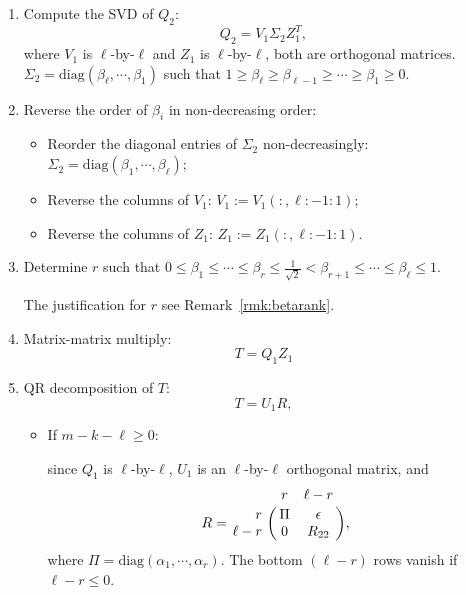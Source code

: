 \begin{enumerate}[Step 2(1).]
\item \label{alg:csd1} 
Compute the SVD of $Q_2$:
\begin{equation}
Q_2 = V_{1}\Sigma_{2}Z_{1}^{T}, 
\end{equation}
where $V_{1}$ is $\ell$-by-$\ell$ and $Z_{1}$ is $\ell$-by-$\ell$, 
both are orthogonal matrices. $\Sigma_{2} = \mbox{diag}(\beta_{\ell}, \cdots, \beta_{1})$ 
such that 
$1 \geq \beta_{\ell} \geq \beta_{\ell-1} \geq \cdots \geq \beta_{1} \geq 0$. 

\item \label{alg:csd2} 
Reverse the order of $\beta_{i}$ in non-decreasing order:

\begin{itemize}
\item Reorder the diagonal entries of $\Sigma_{2}$ non-decreasingly: $\Sigma_{2} = \mbox{diag}(\beta_{1}, \cdots, \beta_{\ell})$; 
\item Reverse the columns of $V_{1}$: $V_{1} := V_{1}(:,\ell:-1:1)$; 
\item Reverse the columns of $Z_{1}$: $Z_{1} := Z_{1}(:,\ell:-1:1)$. 
\end{itemize}

\item \label{alg:csd3} 
Determine $r$ such that 
$0 \leq \beta_{1} \leq \cdots \leq \beta_{r} 
\leq \frac{1}{\sqrt{2}} < \beta_{r+1} 
\leq \cdots \leq \beta_{\ell} \leq 1$. 

The justification for $r$ see Remark~\ref{rmk:betarank}. 

\item \label{alg:csd4} 
Matrix-matrix multiply:
\begin{equation} \label{eq-step3}
T = Q_{1}Z_{1}
\end{equation}

\item \label{alg:csd5} 
QR decomposition of $T$:
\begin{equation} \label{eq-step4}
T = U_{1}R,
\end{equation}
\begin{itemize}
\item If $m - k - \ell \geq 0$:

    since $Q_1$ is $\ell$-by-$\ell$, 
	$U_{1}$ is an $\ell$-by-$\ell$ orthogonal matrix, and
	\begin{equation} \label{eq-R-block-case1}
    R = \bordermatrix{ & r & \ell-r \cr
    \hfill r & \Pi & \epsilon \cr
    \hfill \ell-r & 0 & R_{22}}, 
    \end{equation}
where $\Pi = \mbox{diag}(\alpha_{1}, \cdots, \alpha_{r})$. 
The bottom $(\ell-r)$ rows vanish if $\ell-r \leq 0$.


\end{itemize}
\end{enumerate}
